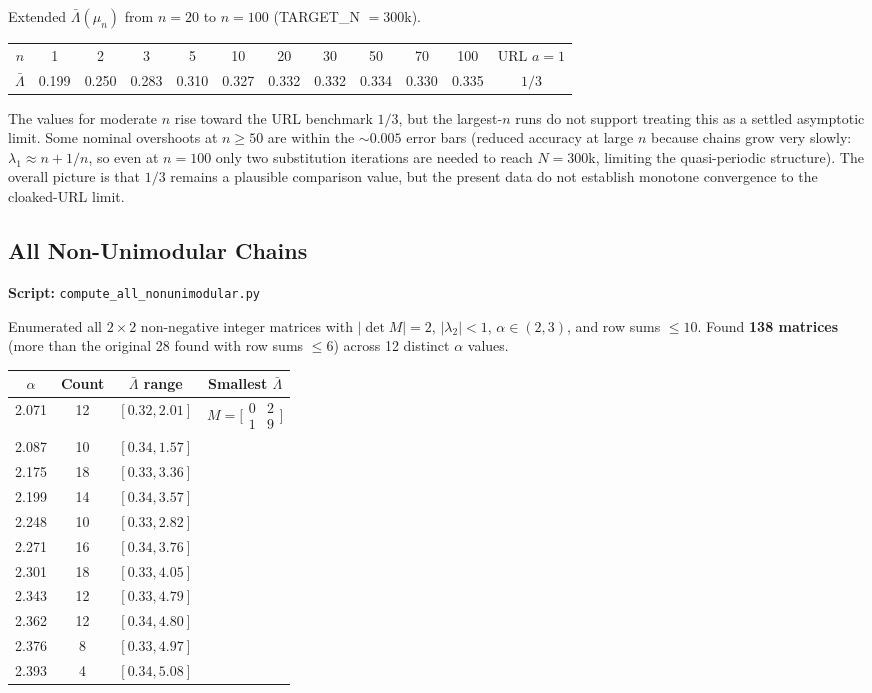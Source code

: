 \documentclass[11pt,letterpaper]{article}
\begin{document}
Extended $\bar\Lambda(\mu_n)$ from $n = 20$ to $n = 100$ (TARGET\_N $= 300$k).

\medskip
\noindent\begin{tabular}{cccccccccccc}
\toprule
$n$ & 1 & 2 & 3 & 5 & 10 & 20 & 30 & 50 & 70 & 100 & URL $a{=}1$ \\
$\bar\Lambda$ & 0.199 & 0.250 & 0.283 & 0.310 & 0.327 & 0.332 & 0.332 & 0.334 & 0.330 & 0.335 & $1/3$ \\
\bottomrule
\end{tabular}

\medskip\noindent
The values for moderate $n$ rise toward the URL benchmark $1/3$, but the largest-$n$
runs do not support treating this as a settled asymptotic limit.
Some nominal overshoots at $n \geq 50$ are within the $\sim\!0.005$ error bars
(reduced accuracy at large $n$ because chains grow very slowly:
$\lambda_1 \approx n + 1/n$, so even at $n = 100$ only two substitution iterations
are needed to reach $N = 300$k, limiting the quasi-periodic structure).
The overall picture is that $1/3$ remains a plausible comparison value, but the present
data do not establish monotone convergence to the cloaked-URL limit.

\subsection{All Non-Unimodular Chains}

\textbf{Script:} \texttt{compute\_all\_nonunimodular.py}

Enumerated all $2\times2$ non-negative integer matrices with $|\det M| = 2$,
$|\lambda_2| < 1$, $\alpha \in (2,3)$, and row sums $\leq 10$.
Found \textbf{138 matrices} (more than the original 28 found with row sums $\leq 6$)
across 12 distinct $\alpha$ values.

\medskip
\noindent\begin{tabular}{cccc}
\toprule
$\alpha$ & Count & $\bar\Lambda$ range & Smallest $\bar\Lambda$ \\
\midrule
2.071 & 12 & $[0.32, 2.01]$ & $M = \bigl[\begin{smallmatrix}0&2\\1&9\end{smallmatrix}\bigr]$ \\
2.087 & 10 & $[0.34, 1.57]$ & \\
2.175 & 18 & $[0.33, 3.36]$ & \\
2.199 & 14 & $[0.34, 3.57]$ & \\
2.248 & 10 & $[0.33, 2.82]$ & \\
2.271 & 16 & $[0.34, 3.76]$ & \\
2.301 & 18 & $[0.33, 4.05]$ & \\
2.343 & 12 & $[0.33, 4.79]$ & \\
2.362 & 12 & $[0.34, 4.80]$ & \\
2.376 &  8 & $[0.33, 4.97]$ & \\
2.393 &  4 & $[0.34, 5.08]$ & \\
\bottomrule
\end{tabular}
\end{document}
